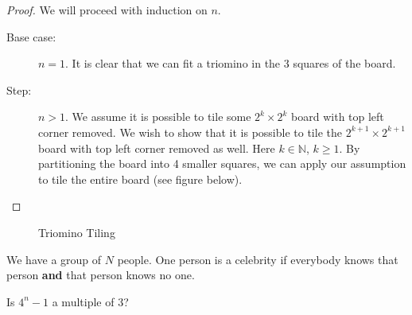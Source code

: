 \begin{proof}
	We will proceed with induction on \( n \).
	\begin{description}
		\item[Base case:] \( n = 1 \). It is clear that we can fit a triomino in the 3 squares of the board.	
		\item[Step:] \( n > 1 \). We assume it is possible to tile some \( 2^k \times 2^k \) board with top left corner removed. We wish to show that it is possible to tile the \( 2^{k+1} \times 2^{k+1}   \) board with top left corner removed as well. Here \( k \in \mathbb{N} \), \( k \ge 1 \). By partitioning the board into 4 smaller squares, we can apply our assumption to tile the entire board (see figure below).
	\end{description}
\end{proof}

\begin{figure}[H]
    \centering
    \caption{Triomino Tiling}
    \label{fig:triomino-tiling}
\end{figure}

\begin{eg}
	We have a group of  \( N \) people. One person is a celebrity if everybody knows that person \textbf{and} that person knows no one.
\end{eg}

Is \( 4^n - 1 \) a multiple of 3?
